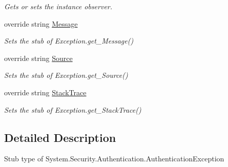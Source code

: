 \begin{DoxyCompactItemize}
\begin{DoxyCompactList}\small\item\em Gets or sets the instance observer.\end{DoxyCompactList}\item 
override string \hyperlink{class_system_1_1_security_1_1_authentication_1_1_fakes_1_1_stub_authentication_exception_aec214bd295473b194a148b71affa727a}{Message}
\begin{DoxyCompactList}\small\item\em Sets the stub of Exception.\-get\-\_\-\-Message()\end{DoxyCompactList}\item 
override string \hyperlink{class_system_1_1_security_1_1_authentication_1_1_fakes_1_1_stub_authentication_exception_afc4a0cc338458bccae5b04e3b662dd42}{Source}
\begin{DoxyCompactList}\small\item\em Sets the stub of Exception.\-get\-\_\-\-Source()\end{DoxyCompactList}\item 
override string \hyperlink{class_system_1_1_security_1_1_authentication_1_1_fakes_1_1_stub_authentication_exception_a3302a0104c86a9a997d0ccb8c493c18e}{Stack\-Trace}
\begin{DoxyCompactList}\small\item\em Sets the stub of Exception.\-get\-\_\-\-Stack\-Trace()\end{DoxyCompactList}\end{DoxyCompactItemize}


\subsection{Detailed Description}
Stub type of System.\-Security.\-Authentication.\-Authentication\-Exception



